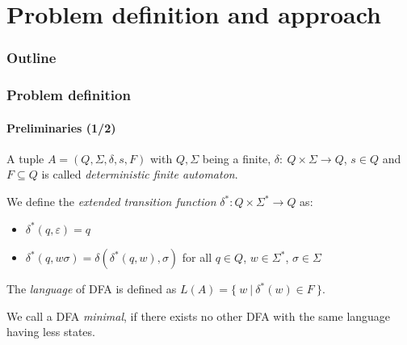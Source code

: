 \documentclass[handout,10pt,usenames,dvipsnames]{beamer}%
\begin{document}
	\section{Problem definition and approach}
	
	\begin{frame}
		\frametitle{Outline}
		\tableofcontents[currentsection] %
	\end{frame}
	
	\begin{frame}
		\frametitle{Problem definition}
		\framesubtitle{Preliminaries (1/2)}
		
		A tuple $A = (Q, \Sigma, \delta, s, F)$ with $Q, \Sigma$ being a finite, $\delta \colon\ Q \times \Sigma \to Q$, $s \in Q$ and $F \subseteq Q$ is called \emph{deterministic finite automaton}.
		\vspace{0.3cm}
		
		
		We define the \emph{extended transition function} $\delta^* : Q \times \Sigma^* \to Q$ as:
		\begin{itemize}
			\item $\delta^*(q,\varepsilon) = q$
			\item $\delta^*(q,w\sigma) = \delta(\delta^*(q,w),\sigma)$ for all $q \in Q$, $w \in \Sigma^*$, $\sigma \in \Sigma$
		\end{itemize}
		\vspace{0.3cm}
		
		The \emph{language} of DFA is defined as $L(A) = \{\ w\ |\ \delta^*(w) \in F\ \}$.
		\vspace{0.3cm}
		
		We call a DFA \emph{minimal}, if there exists no other DFA with the same language having less states.
	\end{frame}
		
\end{document}
